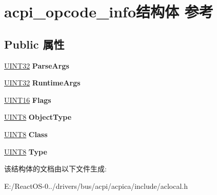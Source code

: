 \hypertarget{structacpi__opcode__info}{}\section{acpi\+\_\+opcode\+\_\+info结构体 参考}
\label{structacpi__opcode__info}
\subsection*{Public 属性}
\begin{DoxyCompactItemize}
\item 
\mbox{\label{structacpi__opcode__info_a0c885ead512d976d020d5172fbd22d88}} 
\hyperlink{_processor_bind_8h_ae1e6edbbc26d6fbc71a90190d0266018}{U\+I\+N\+T32} {\bfseries Parse\+Args}
\item 
\mbox{\label{structacpi__opcode__info_ab114f764af54f6e788c4d0852d519cb5}} 
\hyperlink{_processor_bind_8h_ae1e6edbbc26d6fbc71a90190d0266018}{U\+I\+N\+T32} {\bfseries Runtime\+Args}
\item 
\mbox{\label{structacpi__opcode__info_a7537f321c0848b075ee22904e37cee48}} 
\hyperlink{_processor_bind_8h_a09f1a1fb2293e33483cc8d44aefb1eb1}{U\+I\+N\+T16} {\bfseries Flags}
\item 
\mbox{\label{structacpi__opcode__info_ab931c857660ffa391aea46e856bab749}} 
\hyperlink{_processor_bind_8h_ab27e9918b538ce9d8ca692479b375b6a}{U\+I\+N\+T8} {\bfseries Object\+Type}
\item 
\mbox{\label{structacpi__opcode__info_a20fa77fe56a4b000aa3b387d4eed014e}} 
\hyperlink{_processor_bind_8h_ab27e9918b538ce9d8ca692479b375b6a}{U\+I\+N\+T8} {\bfseries Class}
\item 
\mbox{\label{structacpi__opcode__info_ab4e1eca7e3d7d6a9fe4a1b5efd4b3ba3}} 
\hyperlink{_processor_bind_8h_ab27e9918b538ce9d8ca692479b375b6a}{U\+I\+N\+T8} {\bfseries Type}
\end{DoxyCompactItemize}


该结构体的文档由以下文件生成\+:\begin{DoxyCompactItemize}
\item 
E\+:/\+React\+O\+S-\/0../drivers/bus/acpi/acpica/include/aclocal.\+h\end{DoxyCompactItemize}
